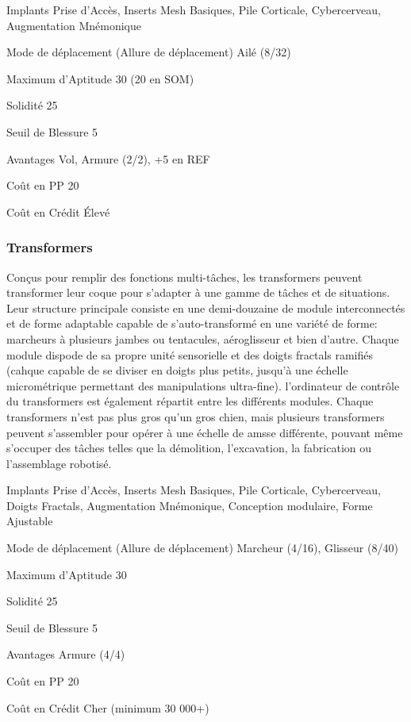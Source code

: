 \begin{description*} \item[Implants] Prise d'Accès, Inserts Mesh Basiques, Pile Corticale, Cybercerveau, Augmentation Mnémonique \item[Mode de déplacement](Allure de déplacement) Ailé (8/32) \item[Maximum d'Aptitude] 30 (20 en SOM) \item[Solidité] 25 \item[Seuil de Blessure] 5 \item[Avantages] Vol, Armure (2/2), +5 en REF \item[Coût en PP] 20 \item[Coût en Crédit] Élevé \end{description*} 

\subsubsection{Transformers} \label{sec:starting-flexbots} 

Conçus pour remplir des fonctions multi-tâches, les transformers peuvent transformer leur coque pour s'adapter à une gamme de tâches et de situations. Leur structure principale consiste en une demi-douzaine de module interconnectés et de forme adaptable capable de s'auto-transformé en une variété de forme: marcheurs à plusieurs jambes ou tentacules, aéroglisseur et bien d'autre. Chaque module dispode de sa propre unité sensorielle et des doigts fractals ramifiés (cahque capable de se diviser en doigts plus petits, jusqu'à une échelle micrométrique permettant des manipulations ultra-fine). l'ordinateur de contrôle du transformers est également répartit entre les différents modules. Chaque transformers n'est pas plus gros qu'un gros chien, mais plusieurs transformers peuvent s'assembler pour opérer à une échelle de amsse différente, pouvant même s'occuper des tâches telles que la démolition, l'excavation, la fabrication ou l'assemblage robotisé. 

\begin{description*} \item[Implants] Prise d'Accès, Inserts Mesh Basiques, Pile Corticale, Cybercerveau, Doigts Fractals, Augmentation Mnémonique, Conception modulaire, Forme Ajustable \item[Mode de déplacement](Allure de déplacement) Marcheur (4/16), Glisseur (8/40) \item[Maximum d'Aptitude] 30 \item[Solidité] 25 \item[Seuil de Blessure] 5 \item[Avantages] Armure (4/4) \item[Coût en PP] 20 \item[Coût en Crédit] Cher (minimum 30 000+) \end{description*} 

